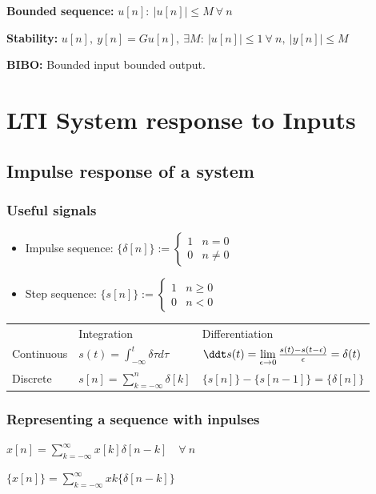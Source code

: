 \documentclass[8pt,a4paper]{scrartcl}
\begin{document}
\begin{multicols*}{3}
\textbf{Bounded sequence:} $u[n]:\ |u[n]|\leq M\ \forall\ n$ 

\textbf{Stability:} $u[n],\ y[n]=Gu[n],\ \exists M:\ |u[n]|\leq 1\ \forall\ n,\ |y[n]|\leq M$

\textbf{BIBO:} Bounded input bounded output.

\section{LTI System response to Inputs}

\subsection{Impulse response of a system}

\subsubsection{Useful signals}

\begin{itemize}
\item Impulse sequence: $\{\delta[n]\}:=\begin{cases}1&n=0\\0&n\neq 0\end{cases}$
\item Step sequence: $\{s[n]\}:=\begin{cases}1&n\geq 0\\0&n<0\end{cases}$
\end{itemize}

\small
\begin{tabular}{lll}
&Integration&Differentiation\\
Continuous&$s(t)=\int_{-\infty}^t\delta{\tau}d\tau$&$\ddt s(t)=\lim\limits_{\epsilon\rightarrow 0}\frac{s(t)-s(t-\epsilon)}{\epsilon}=\delta(t)$\\
Discrete&$s[n]=\sum\limits_{k=-\infty}^n\delta[k]$&$\{s[n]\}-\{s[n-1]\}=\{\delta[n]\}$
\end{tabular}
\normalsize

\subsubsection{Representing a sequence with inpulses}

$x[n]=\sum\limits_{k=-\infty}^\infty x[k]\delta[n-k]\quad\forall\ n$

$\{x[n]\}=\sum\limits_{k=-\infty}^\infty x{k}\{\delta[n-k]\}$


\end{multicols*}
\end{document}

